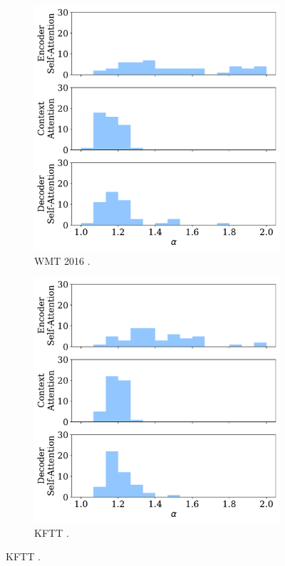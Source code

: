 \begin{figure}[!htbp]
    \centering
    \begin{subfigure}[b]{.49\linewidth}
        \includegraphics[width=\linewidth]{Figures/hist_alphas_ro.pdf}
        \caption{%
            \label{fig:hist_alphas_ro}%
            WMT 2016 .}
    \end{subfigure}
    \begin{subfigure}[b]{.49\linewidth}
        \includegraphics[width=\linewidth]{Figures/hist_alphas_ja.pdf}
        \caption{%
            \label{fig:hist_alphas_ja}%
            KFTT .}
    \end{subfigure}


\end{figure}
